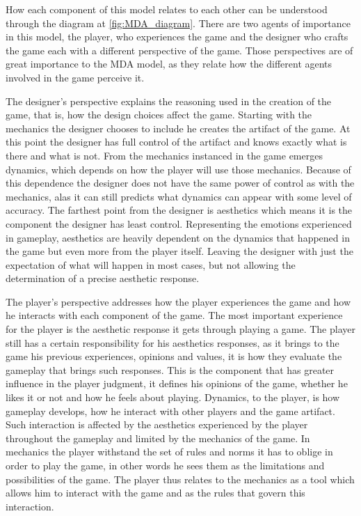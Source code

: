 

How each component of this model relates to each other can be understood through the diagram at \autoref{fig:MDA_diagram}. There are two agents of importance in this model, the player, who experiences the game and the designer who crafts the game each with a different perspective of the game. Those perspectives are of great importance to the MDA model, as they relate how the different agents involved in the game perceive it. 

The designer's perspective explains the reasoning used in the creation of the game, that is, how the design choices affect the game. Starting with the mechanics the designer chooses to include he creates the artifact of the game. At this point the designer has full control of the artifact and knows exactly what is there and what is not. From the mechanics instanced in the game emerges dynamics, which depends on how the player will use those mechanics. Because of this dependence the designer does not have the same power of control as with the mechanics, alas it can still predicts what dynamics can appear with some level of accuracy. The farthest point from the designer is aesthetics which means it is the component the designer has least control. Representing the emotions experienced in gameplay, aesthetics are heavily dependent on the dynamics that happened in the game but even more from the player itself. Leaving the designer with just the expectation of what will happen in most cases, but not allowing the determination of a precise aesthetic response. 

The player's perspective addresses how the player experiences the game and how he interacts with each component of the game. The most important experience for the player is the aesthetic response it gets through playing a game. The player still has a certain responsibility for his aesthetics responses, as it brings to the game his previous experiences, opinions and values, it is how they evaluate the gameplay that brings such responses. This is the component that has greater influence in the player judgment, it defines his opinions of the game, whether he likes it or not and how he feels about playing. Dynamics, to the player, is how gameplay develops, how he interact with other players and the game artifact. Such interaction is affected by the aesthetics experienced by the player throughout the gameplay and limited by the mechanics of the game. In mechanics the player withstand the set of rules and norms it has to oblige in order to play the game, in other words he sees them as the limitations and possibilities of the game. The player thus relates to the mechanics as a tool which allows him to interact with the game and as the rules that govern this interaction. 

